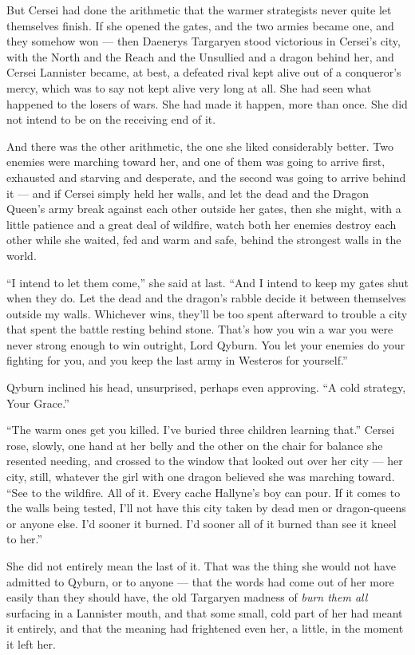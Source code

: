 But Cersei had done the arithmetic that the warmer strategists never quite let themselves finish. If she opened the gates, and the two armies became one, and they somehow won — then Daenerys Targaryen stood victorious in Cersei’s city, with the North and the Reach and the Unsullied and a dragon behind her, and Cersei Lannister became, at best, a defeated rival kept alive out of a conqueror’s mercy, which was to say not kept alive very long at all. She had seen what happened to the losers of wars. She had made it happen, more than once. She did not intend to be on the receiving end of it.

And there was the other arithmetic, the one she liked considerably better. Two enemies were marching toward her, and one of them was going to arrive first, exhausted and starving and desperate, and the second was going to arrive behind it — and if Cersei simply held her walls, and let the dead and the Dragon Queen’s army break against each other outside her gates, then she might, with a little patience and a great deal of wildfire, watch both her enemies destroy each other while she waited, fed and warm and safe, behind the strongest walls in the world.

“I intend to let them come,” she said at last. “And I intend to keep my gates shut when they do. Let the dead and the dragon’s rabble decide it between themselves outside my walls. Whichever wins, they’ll be too spent afterward to trouble a city that spent the battle resting behind stone. That’s how you win a war you were never strong enough to win outright, Lord Qyburn. You let your enemies do your fighting for you, and you keep the last army in Westeros for yourself.”

Qyburn inclined his head, unsurprised, perhaps even approving. “A cold strategy, Your Grace.”

“The warm ones get you killed. I’ve buried three children learning that.” Cersei rose, slowly, one hand at her belly and the other on the chair for balance she resented needing, and crossed to the window that looked out over her city — her city, still, whatever the girl with one dragon believed she was marching toward. “See to the wildfire. All of it. Every cache Hallyne’s boy can pour. If it comes to the walls being tested, I’ll not have this city taken by dead men or dragon-queens or anyone else. I’d sooner it burned. I’d sooner all of it burned than see it kneel to her.”

\sceneBreak

She did not entirely mean the last of it. That was the thing she would not have admitted to Qyburn, or to anyone — that the words had come out of her more easily than they should have, the old Targaryen madness of \textit{burn them all} surfacing in a Lannister mouth, and that some small, cold part of her had meant it entirely, and that the meaning had frightened even her, a little, in the moment it left her.

